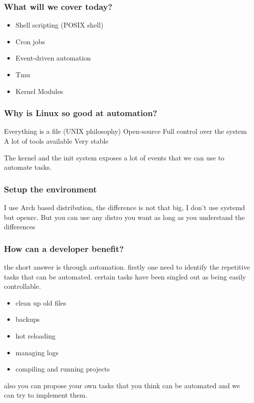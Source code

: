 \documentclass{beamer}
\begin{document}
\begin{frame}
\frametitle{What will we cover today?}
\begin{itemize}
    \small
    \item Shell scripting (POSIX shell) \pause
    \item Cron jobs\pause
    \item Event-driven automation\pause
    \item Tmu\pause
    \item Kernel Modules
\end{itemize}

\end{frame}

\begin{frame}
\frametitle{Why is Linux so good at automation?}
\small
    Everything is a file (UNIX philosophy) \newline
    Open-source \newline
    Full control over the system \newline
    A lot of tools available \newline
    Very stable \newline

    The kernel and the init system exposes a lot of events that we can use to
    automate tasks.

\end{frame}

\begin{frame}
\frametitle{Setup the environment}
\small
    I use Arch based distribution, the difference is not that big, I don't use
    systemd but openrc. \newline
    But you can use any distro you want as long as you understand the differences

\end{frame}


\begin{frame}
\frametitle{How can a developer benefit?}
\small
the short answer is through automation. \newline
firstly one need to identify the repetitive tasks that can be automated.\newline
certain tasks have been singled out as being easily controllable.
    \begin{itemize}
        \item clean up old files
        \item backups
        \item hot reloading
        \item managing logs
        \item compiling and running projects
    \end{itemize}
    also you can propose your own tasks that you think can be automated and
    we can try to implement them.

\end{frame}
\end{document}
